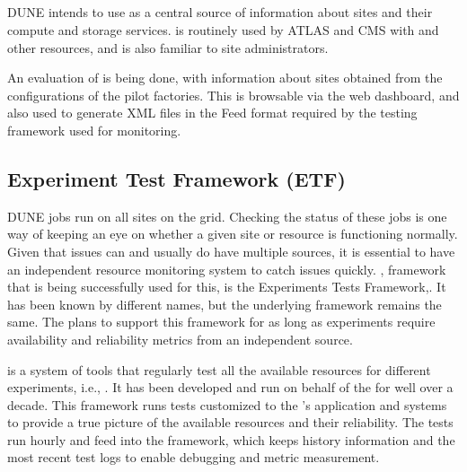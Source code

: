 \documentclass[../main-v1.tex]{subfiles}
\begin{document}
\subsection{} %

DUNE intends to use   as a central source of information about sites and their compute and storage services.  is routinely used by ATLAS and CMS with  and other  resources, and is also familiar to site administrators. 

An evaluation of  is being done, with information about sites obtained from the configurations of the  pilot factories. This is browsable via the  web dashboard, and also used to generate XML files in the  Feed format required by the  testing framework used for monitoring.

\subsection{Experiment Test Framework (ETF)}

DUNE jobs  run on all sites on the grid. Checking the status of these jobs is one way of keeping an eye on whether a given site or resource is functioning normally. Given that issues can and usually do have multiple sources, it is essential to have an independent resource monitoring system to %
catch issues quickly. %
, framework that is being successfully used for this, is the  %
 Experiments Tests Framework\cite{bib:ETFDoc},\cite{bib:ETFStatus}. It  has been known by different names, but the underlying framework remains the same. The  plans to support this framework for as long as  experiments require availability and reliability metrics from an independent source.
 
 is a system of tools that regularly test all the available resources for different experiments, i.e., . It has been developed and run on behalf of the  %
  for well over a decade. %
This framework runs tests customized to the 's application and systems to provide a true picture of the  available resources and their reliability. The  tests run hourly and feed into the  
framework, which keeps history information and the most recent test logs to enable debugging and metric measurement.
\end{document}

